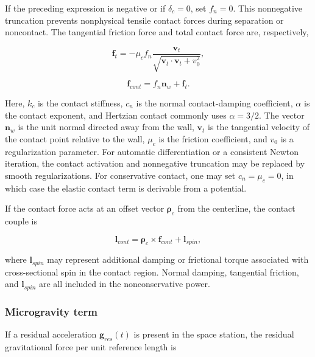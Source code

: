 If the preceding expression is negative or if \(\delta_{c} = 0\), set \(f_{n} = 0\). This nonnegative truncation prevents nonphysical tensile contact forces during separation or noncontact. The tangential friction force and total contact force are, respectively,

\begin{equation}
\label{eq:rod-1-69}
\mathbf{f}_{t} = - \mu_{c}f_{n}\frac{\mathbf{v}_{t}}{\sqrt{\mathbf{v}_{t} \cdot \mathbf{v}_{t} + v_{0}^{2}}},
\end{equation}

\begin{equation}
\label{eq:rod-1-70}
\mathbf{f}_{cont} = f_{n}\mathbf{n}_{w} + \mathbf{f}_{t}.
\end{equation}

Here, \(k_{c}\) is the contact stiffness, \(c_{n}\) is the normal contact-damping coefficient, \(\alpha\) is the contact exponent, and Hertzian contact commonly uses \(\alpha = 3/2\). The vector \(\mathbf{n}_{w}\) is the unit normal directed away from the wall, \(\mathbf{v}_{t}\) is the tangential velocity of the contact point relative to the wall, \(\mu_{c}\) is the friction coefficient, and \(v_{0}\) is a regularization parameter. For automatic differentiation or a consistent Newton iteration, the contact activation and nonnegative truncation may be replaced by smooth regularizations. For conservative contact, one may set \(c_{n} = \mu_{c} = 0\), in which case the elastic contact term is derivable from a potential.

If the contact force acts at an offset vector \(\bm{\rho}_{c}\) from the centerline, the contact couple is

\begin{equation}
\label{eq:rod-1-71}
\mathbf{l}_{cont} = \bm{\rho}_{c} \times \mathbf{f}_{cont} + \mathbf{l}_{spin},
\end{equation}

where \(\mathbf{l}_{spin}\) may represent additional damping or frictional torque associated with cross-sectional spin in the contact region. Normal damping, tangential friction, and \(\mathbf{l}_{spin}\) are all included in the nonconservative power.

\subsubsection{Microgravity term}\label{sec:rod-1-4-6}

If a residual acceleration \(\mathbf{g}_{res}(t)\) is present in the space station, the residual gravitational force per unit reference length is


